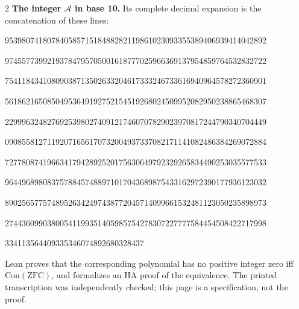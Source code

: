 \documentclass[10pt]{article}
\begin{document}
\begin{multicols}{2}
\textbf{The integer $\mathcal A$ in base 10.}
Its complete decimal expansion is the concatenation of these lines:\par
\begingroup\fontsize{7.7}{8.2}\selectfont{}\par
95398074180784058571518488282119861023093355389406939414042892\par
97455773992193784795705001618777025966369137954859764532832722\par
75411843410809038713502633204617333246733616940964578272360901\par
56186216508504953649192752154519268024509952082950238865468307\par
22999632482769253980274091217460707829023970817244790340704449\par
09085581271192071656170732004937337082171141082486384269072884\par
72778087419663417942892520175630649792329265834490253035577533\par
96449689808375788457488971017043689875433162972390177936123032\par
89025657757489526342497438772045714099661532481123050235898973\par
27443609903800541199351405985754278307227777584454508422717998\par
334113564409335346074892680328437\par
\endgroup
\normalfont\fontsize{7.7}{8.2}\selectfont
Lean proves that the corresponding polynomial has no positive integer zero iff
$\mathrm{Con}(\mathrm{ZFC})$, and formalizes an HA proof of the equivalence.
The printed transcription was independently checked; this page is a
specification, not the proof.
\end{multicols}
\end{document}
